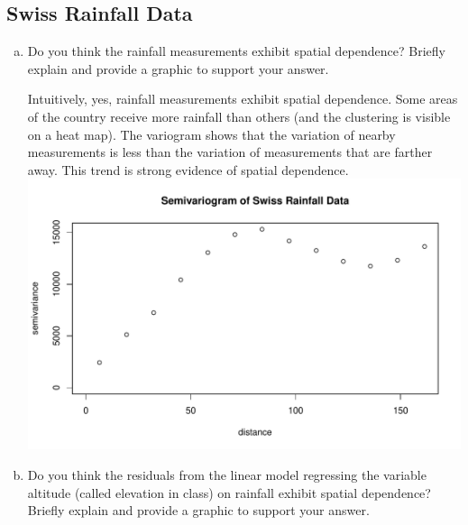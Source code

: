 \documentclass[letterpaper, 12pt]{article}\usepackage[]{graphicx}\usepackage[]{color}
\makeatletter
\def\maxwidth{ %
  \ifdim\Gin@nat@width>\linewidth
    \linewidth
  \else
    \Gin@nat@width
  \fi
}
\newenvironment{knitrout}{}{} %
\makeatother
\begin{document}
\subsection*{Swiss Rainfall Data}
\begin{enumerate}[a.]
\item
Do you think the rainfall measurements exhibit spatial dependence? Briefly explain and provide a graphic to support your answer.

\textsf{
Intuitively, yes, rainfall measurements exhibit spatial dependence. Some areas of the country receive more rainfall than others (and the clustering is visible on a heat map). The variogram shows that the variation of nearby measurements is less than the variation of measurements that are farther away. This trend is strong evidence of spatial dependence.
}
\begin{knitrout}
\color{fgcolor}
\includegraphics[width=\maxwidth]{figure/rainfall} 

\end{knitrout}

\item
Do you think the residuals from the linear model regressing the variable altitude (called elevation in class) on rainfall exhibit spatial dependence? Briefly explain and provide a graphic to support your answer.


\end{enumerate}
\end{document}
